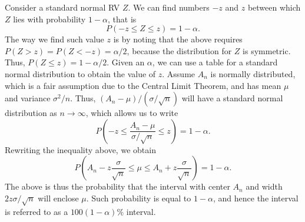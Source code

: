\documentclass[11pt]{article}
\begin{document}
Consider a standard normal RV $Z$. We can find numbers $-z$ and $z$ between which $Z$ lies with probability $1-\alpha$, that is
\begin{equation}
P(-z \le Z \le z) = 1 - \alpha.
\end{equation}
The way we find such value $z$ is by noting that the above requires $P(Z > z) = P(Z < -z) = \alpha /2$, because the distribution for $Z$ is symmetric. Thus, $P(Z \le z) = 1 - \alpha/2$. Given an $\alpha$, we can use a table for a standard normal distribution to obtain the value of $z$. Assume $A_n$ is normally distributed, which is a fair assumption due to the Central Limit Theorem, and has mean $\mu$ and variance $\sigma^2/n$. Thus, $(A_n - \mu)/(\sigma/\sqrt{n})$ will have a standard normal distribution as $n \to \infty$, which allows us to write
\begin{equation}
P(-z \le \frac{A_n - \mu}{\sigma/\sqrt{n}} \le z) = 1 - \alpha .
\end{equation}
Rewriting the inequality above, we obtain
\begin{equation}
P(A_n - z \frac{\sigma}{\sqrt{n}} \le \mu \le A_n + z \frac{\sigma}{\sqrt{n}} ) = 1 - \alpha .
\end{equation}
The above is thus the probability that the interval with center $A_n$ and width $2z\sigma/\sqrt{n}$ will enclose $\mu$. Such probability is equal to $1-\alpha$, and hence the interval is referred to as a $100 (1-\alpha) \%$ interval.
\end{document}
